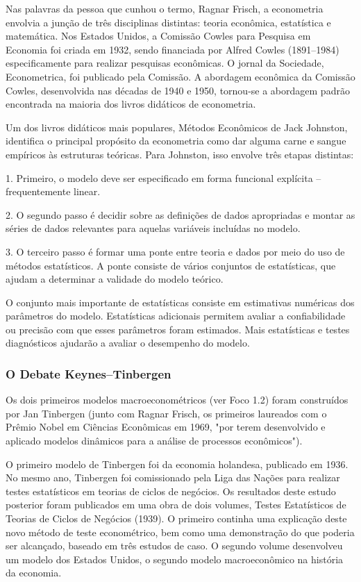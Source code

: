 \documentclass[12pt]{article}
\begin{document}
Nas palavras da pessoa que cunhou o termo, Ragnar Frisch, a econometria envolvia a junção de três disciplinas distintas: teoria econômica, estatística e matemática. Nos Estados Unidos, a Comissão Cowles para Pesquisa em Economia foi criada em 1932, sendo financiada por Alfred Cowles (1891–1984) especificamente para realizar pesquisas econômicas. O jornal da Sociedade, Econometrica, foi publicado pela Comissão. A abordagem econômica da Comissão Cowles, desenvolvida nas décadas de 1940 e 1950, tornou-se a abordagem padrão encontrada na maioria dos livros didáticos de econometria.

Um dos livros didáticos mais populares, Métodos Econômicos de Jack Johnston, identifica o principal propósito da econometria como dar alguma carne e sangue empíricos às estruturas teóricas. Para Johnston, isso envolve três etapas distintas:

1. Primeiro, o modelo deve ser especificado em forma funcional explícita – frequentemente
linear.

2. O segundo passo é decidir sobre as definições de dados apropriadas e
montar as séries de dados relevantes para aquelas variáveis incluídas no
modelo.

3. O terceiro passo é formar uma ponte entre teoria e dados por meio do
uso de métodos estatísticos. A ponte consiste de vários conjuntos de estatísticas,
que ajudam a determinar a validade do modelo teórico.

O conjunto mais importante de estatísticas consiste em estimativas numéricas dos
parâmetros do modelo. Estatísticas adicionais permitem avaliar a
confiabilidade ou precisão com que esses parâmetros foram estimados.
Mais estatísticas e testes diagnósticos ajudarão a avaliar o desempenho
do modelo.

\subsubsection{\textbf{O Debate Keynes–Tinbergen}}
Os dois primeiros modelos macroeconométricos (ver Foco 1.2) foram construídos
por Jan Tinbergen (junto com Ragnar Frisch, os primeiros laureados com o Prêmio Nobel
em Ciências Econômicas em 1969, "por terem desenvolvido e aplicado
modelos dinâmicos para a análise de processos econômicos").

O primeiro modelo de Tinbergen foi da economia holandesa, publicado em 1936.
No mesmo ano, Tinbergen foi comissionado pela Liga das Nações
para realizar testes estatísticos em teorias de ciclos de negócios. Os resultados deste
estudo posterior foram publicados em uma obra de dois volumes, Testes Estatísticos de
Teorias de Ciclos de Negócios (1939). O primeiro continha uma explicação deste
novo método de teste econométrico, bem como uma demonstração do que
poderia ser alcançado, baseado em três estudos de caso. O segundo volume desenvolveu
um modelo dos Estados Unidos, o segundo modelo macroeconômico na
história da economia.
\end{document}
